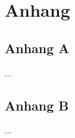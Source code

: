 \chapter*{Anhang}
\label{cap:Anhang}


\section*{Anhang A}
\label{sec:Anhang A}

...


\section*{Anhang B}
\label{sec:Anhang B}

...
